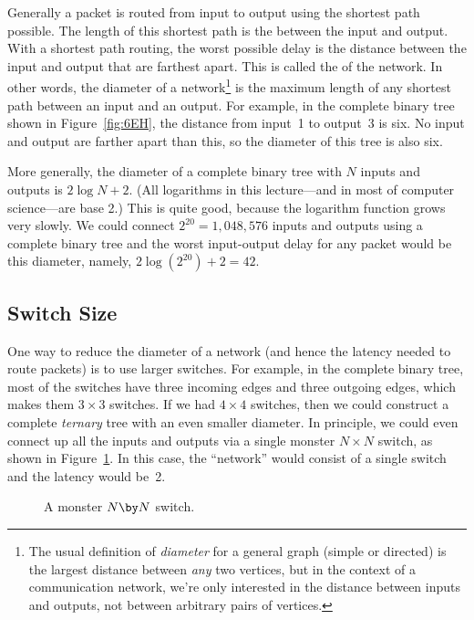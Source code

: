 Generally a packet is routed from input to output using the shortest
path possible.  The length of this shortest path is the
 between the input and output.  With a shortest path
routing, the worst possible delay is the distance between the input
and output that are farthest apart.  This is called the
 of the network.  In other words, the diameter of a
network\footnote{The usual definition of \emph{diameter} for a general
  graph (simple or directed) is the largest distance between
  \emph{any} two vertices, but in the context of a communication
  network, we're only interested in the distance between inputs and
  outputs, not between arbitrary pairs of vertices.} is the maximum
length of any shortest path between an input and an output.  For
example, in the complete binary tree shown in Figure~\ref{fig:6EH},
the distance from input~1 to output~3 is six.  No input and output are
farther apart than this, so the diameter of this tree is also six.

More generally, the diameter of a complete binary tree with $N$ inputs
and outputs is $2 \log N + 2$.  (All logarithms in this lecture---and
in most of computer science---are base 2.)  This is quite good,
because the logarithm function grows very slowly.  We could connect
$2^{20} = 1{,}048{,}576$ inputs and outputs using a complete binary
tree and the worst input-output delay for any packet would be this
diameter, namely, $2 \log(2^{20}) + 2 = 42$.

\subsection{Switch Size}

One way to reduce the diameter of a network (and hence the latency
needed to route packets) is to use larger switches.  For example, in
the complete binary tree, most of the switches have three incoming
edges and three outgoing edges, which makes them $3 \times 3$
switches.  If we had $4 \times 4$ switches, then we could construct a
complete \emph{ternary} tree with an even smaller diameter.  In
principle, we could even connect up all the inputs and outputs via a
single monster $N \times N$ switch, as shown in Figure~\ref{fig:6EI}.
In this case, the ``network'' would consist of a single switch and the
latency would be~2.

\begin{figure}


\caption{A monster $N \by N$ switch.}

\label{fig:6EI}

\end{figure}

